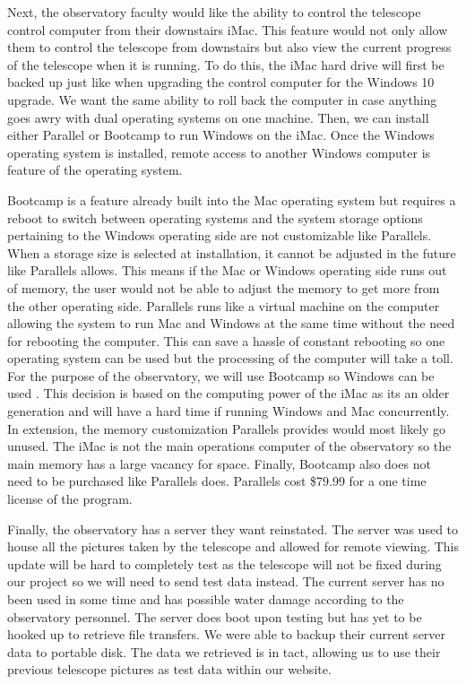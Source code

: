 \documentclass[12pt]{report}
\begin{document}
\begin{enumerate}
Next, the observatory faculty would like the ability to control the telescope control computer from their downstairs iMac. This feature would not only allow them to control the telescope from downstairs but also view the current progress of the telescope when it is running. To do this, the iMac hard drive will first be backed up just like when upgrading the control computer for the Windows 10 upgrade. We want the same ability to roll back the computer in case anything goes awry with dual operating systems on one machine. Then, we can install either Parallel or Bootcamp to run Windows on the iMac. Once the Windows operating system is installed, remote access to another Windows computer is feature of the operating system.

Bootcamp is a feature already built into the Mac operating system but requires a reboot to switch between operating systems and the system storage options pertaining to the Windows operating side are not customizable like Parallels. When a storage size is selected at installation, it cannot be adjusted in the future like Parallels allows. This means if the Mac or Windows operating side runs out of memory, the user would not be able to adjust the memory to get more from the other operating side. Parallels runs like a virtual machine on the computer allowing the system to run Mac and Windows at the same time without the need for rebooting the computer. This can save a hassle of constant rebooting so one operating system can be used but the processing of the computer will take a toll. For the purpose of the observatory, we will use Bootcamp so Windows can be used \cite{paral}. This decision is based on the computing power of the iMac as its an older generation and will have a hard time if running Windows and Mac concurrently. In extension, the memory customization Parallels provides would most likely go unused. The iMac is not the main operations computer of the observatory so the main memory has a large vacancy for space. Finally, Bootcamp also does not need to be purchased like Parallels does. Parallels cost \$79.99 for a one time license of the program.

Finally, the observatory has a server they want reinstated. The server was used to house all the pictures taken by the telescope and allowed for remote viewing. This update will be hard to completely test as the telescope will not be fixed during our project so we will need to send test data instead. The current server has no been used in some time and has possible water damage according to the observatory personnel. The server does boot upon testing but has yet to be hooked up to retrieve file transfers. We were able to backup their current server data to portable disk. The data we retrieved is in tact, allowing us to use their previous telescope pictures as test data within our website.


\end{enumerate}
\end{document}
